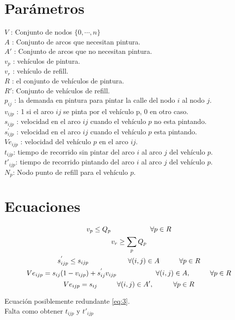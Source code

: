 \documentclass[12 pt]{article}
\begin{document}
\section*{Parámetros}
$V$ : Conjunto de nodos $\{ 0, \cdots, n \}$ \\
$A$ : Conjunto de arcos que necesitan pintura. \\
$A'$ : Conjunto de arcos que no necesitan pintura. \\
$v_p$ : vehículos de pintura. \\ 
$v_r$ : vehículo de refill. \\ 
$R$ : el conjunto de vehículos de pintura.\\
$R'$: Conjunto de vehículos de refill.\\ 
$p_{ij}$ : la demanda en pintura para pintar la calle del nodo $i$ al nodo $j$.\\
$v_{ijp}$ : 1 si el arco $ij$ se pinta por el vehículo p, 0 en otro caso. \\
$s_{ijp}$ : velocidad en el arco $ij$ cuando el vehículo $p$ no esta pintando. \\
$s^{'}_{ijp}$ : velocidad en el arco $ij$ cuando el vehículo $p$ esta pintando. \\ 
$Ve_{ijp}$ : velocidad del vehículo $p$ en el arco $ij$. \\
$t_{ijp}$: tiempo de recorrido sin pintar del arco $i$ al arco $j$ del vehículo $p$. \\
$t'_{ijp}$: tiempo de recorrido pintando del arco $i$ al arco $j$ del vehículo $p$. \\
$N_p$: Nodo punto de refill para el vehículo $p$. 



\section*{Ecuaciones}
\begin{center}
\begin{gather} 
v_{p} \leq Q_p \hspace{2 cm} \forall p \in R \\
v_r \geq \sum_{p} Q_p \\
s^{'}_{ijp} \leq s_{ijp} \label{eq:3} \hspace{2 cm} \forall (i,j) \in A \hspace{1 cm} \forall p \in R\\
Ve_{ijp} = s_{ij}(1-v_{ijp}) + s^{'}_{ij}v_{ijp}  \hspace{2 cm} \forall (i,j) \in A, \hspace{1 cm} \forall p \in R \\ 
Ve_{ijp} = s_{ij}  \hspace{1 cm} \forall (i,j) \in A', \hspace{1 cm} \forall p \in R 
\end{gather}
\end{center}
Ecuación posiblemente redundante \ref{eq:3}. \\
Falta como obtener $t_{ijp}$ y $t'_{ijp}$
\end{document}
